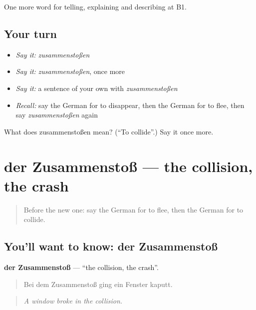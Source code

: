 \begin{grammarlens}[title={What you've built}]
One more word for telling, explaining and describing at B1.
\end{grammarlens}

\subsection*{Your turn}
\begin{itemize}
\raggedright
  \item \emph{Say it:} \emph{zusammenstoßen}
  \item \emph{Say it:} \emph{zusammenstoßen}, once more
  \item \emph{Say it:} a sentence of your own with \emph{zusammenstoßen}
  \item \emph{Recall:} say the German for to disappear, then the German for to flee, then say \emph{zusammenstoßen} again
\end{itemize}

\begin{tcolorbox}[breakable,colback=teal!4,colframe=teal!35!black,title={Before you move on}]
What does zusammenstoßen mean? (\textquotedblleft{}To collide\textquotedblright{}.) Say it once more.
\end{tcolorbox}
\section[der Zusammenstoß]{der Zusammenstoß — the collision, the crash}

\label{lesson:GE-C288-zusammenstoss}



\begin{quote}
Before the new one: say the German for to flee, then the German for to collide.
\end{quote}

\subsection*{You'll want to know: der Zusammenstoß}
\textbf{der Zusammenstoß} — \textquotedblleft{}the collision, the crash\textquotedblright{}.

\begin{quote}
Bei dem Zusammenstoß ging ein Fenster kaputt.
\end{quote}

\begin{quote}
\emph{A window broke in the collision.}
\end{quote}

